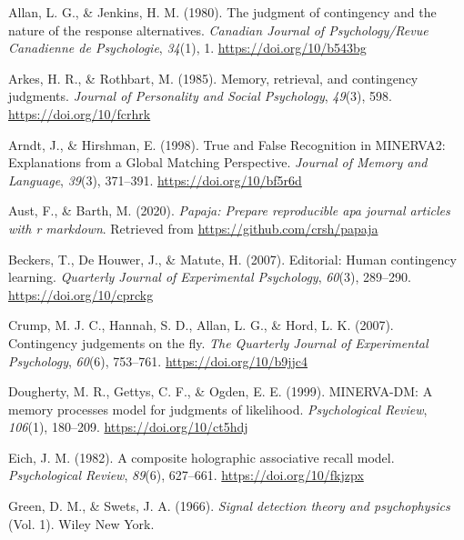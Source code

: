 \documentclass[
  english,
  man,floatsintext]{apa6}
\begin{document}
\leavevmode\hypertarget{ref-allanJudgmentContingencyNature1980}{}%
Allan, L. G., \& Jenkins, H. M. (1980). The judgment of contingency and the nature of the response alternatives. \emph{Canadian Journal of Psychology/Revue Canadienne de Psychologie}, \emph{34}(1), 1. \url{https://doi.org/10/b543bg}

\leavevmode\hypertarget{ref-arkesMemoryRetrievalContingency1985}{}%
Arkes, H. R., \& Rothbart, M. (1985). Memory, retrieval, and contingency judgments. \emph{Journal of Personality and Social Psychology}, \emph{49}(3), 598. \url{https://doi.org/10/fcrhrk}

\leavevmode\hypertarget{ref-arndtTrueFalseRecognition1998}{}%
Arndt, J., \& Hirshman, E. (1998). True and False Recognition in MINERVA2: Explanations from a Global Matching Perspective. \emph{Journal of Memory and Language}, \emph{39}(3), 371--391. \url{https://doi.org/10/bf5r6d}

\leavevmode\hypertarget{ref-R-papaja}{}%
Aust, F., \& Barth, M. (2020). \emph{Papaja: Prepare reproducible apa journal articles with r markdown}. Retrieved from \url{https://github.com/crsh/papaja}

\leavevmode\hypertarget{ref-beckersEditorialHumanContingency2007}{}%
Beckers, T., De Houwer, J., \& Matute, H. (2007). Editorial: Human contingency learning. \emph{Quarterly Journal of Experimental Psychology}, \emph{60}(3), 289--290. \url{https://doi.org/10/cprckg}

\leavevmode\hypertarget{ref-crumpContingencyJudgementsFly2007}{}%
Crump, M. J. C., Hannah, S. D., Allan, L. G., \& Hord, L. K. (2007). Contingency judgements on the fly. \emph{The Quarterly Journal of Experimental Psychology}, \emph{60}(6), 753--761. \url{https://doi.org/10/b9jjc4}

\leavevmode\hypertarget{ref-doughertyMINERVADMMemoryProcesses1999}{}%
Dougherty, M. R., Gettys, C. F., \& Ogden, E. E. (1999). MINERVA-DM: A memory processes model for judgments of likelihood. \emph{Psychological Review}, \emph{106}(1), 180--209. \url{https://doi.org/10/ct5hdj}

\leavevmode\hypertarget{ref-eichCompositeHolographicAssociative1982}{}%
Eich, J. M. (1982). A composite holographic associative recall model. \emph{Psychological Review}, \emph{89}(6), 627--661. \url{https://doi.org/10/fkjzpx}

\leavevmode\hypertarget{ref-greenSignalDetectionTheory1966}{}%
Green, D. M., \& Swets, J. A. (1966). \emph{Signal detection theory and psychophysics} (Vol. 1). Wiley New York.
\end{document}
